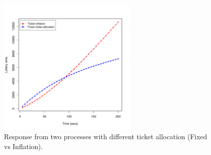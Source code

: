\documentclass[10pt]{scrartcl}
\begin{document}
\begin{figure}
  \centering
  \includegraphics[width=0.6\textwidth]{test2}
  \caption{Response from two processes with different ticket allocation (Fixed vs Inflation).}\label{fig:test2b}
\end{figure}

% 
% 
\end{document}
